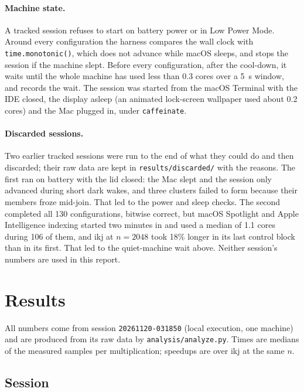 \documentclass[11pt,a4paper]{article}
\newcommand{\session}{\texttt{20261120-031850}}
\begin{document}
\paragraph{Machine state.} A tracked session refuses to start on battery
power or in Low Power Mode. Around every configuration the harness compares the
wall clock with \texttt{time.monotonic()}, which does not advance while macOS
sleeps, and stops the session if the machine slept. Before every configuration,
after the cool-down, it waits until the whole machine has used less than 0.3
cores over a 5~s window, and records the wait. The session was started from the
macOS Terminal with the IDE closed, the display asleep (an animated lock-screen
wallpaper used about 0.2 cores) and the Mac plugged in, under
\texttt{caffeinate}.

\paragraph{Discarded sessions.} Two earlier tracked sessions were run to the
end of what they could do and then discarded; their raw data are kept in
\texttt{results/discarded/} with the reasons. The first ran on battery with the
lid closed: the Mac slept and the session only advanced during short dark
wakes, and three clusters failed to form because their members froze mid-join.
That led to the power and sleep checks. The second completed all 130
configurations, bitwise correct, but macOS Spotlight and Apple Intelligence
indexing started two minutes in and used a median of 1.1 cores during 106 of
them, and ikj at $n=2048$ took 18\% longer in its last control block than in
its first. That led to the quiet-machine wait above. Neither session's numbers
are used in this report.

\section{Results}
\label{sec:results}

All numbers come from session \session{} (local execution, one machine) and are
produced from its raw data by \texttt{analysis/analyze.py}. Times are medians of
the measured samples per multiplication; speedups are over ikj at the same $n$.

\subsection{Session}
\label{sec:session}
\end{document}
